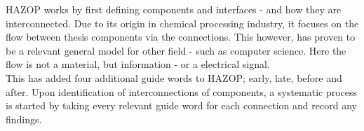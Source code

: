 
HAZOP works by first defining components and interfaces - and how they are interconnected. Due to its origin in chemical processing industry, it focuses on the flow between thesis components via the connections. This however, has proven to be a relevant general model for other field - such as computer science. Here the flow is not a material, but information - or a electrical signal.\\
This has added four additional guide words to HAZOP; early, late, before and after.
Upon identification of interconnections of components, a systematic process is started by taking every relevant guide word for each connection and record any findings.


